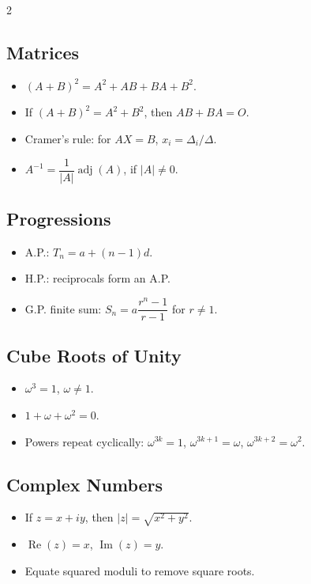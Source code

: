 \documentclass[11pt,a4paper]{article}
\begin{document}
\begin{multicols}{2}
\subsection*{Matrices}
\begin{itemize}[leftmargin=*]
\item $(A+B)^2=A^2+AB+BA+B^2$.
\item If $(A+B)^2=A^2+B^2$, then $AB+BA=O$.
\item Cramer's rule: for $AX=B$, $x_i=\Delta_i/\Delta$.
\item $A^{-1}=\dfrac{1}{|A|}\operatorname{adj}(A)$, if $|A|\ne0$.
\end{itemize}

\subsection*{Progressions}
\begin{itemize}[leftmargin=*]
\item A.P.: $T_n=a+(n-1)d$.
\item H.P.: reciprocals form an A.P.
\item G.P. finite sum: $S_n=a\dfrac{r^n-1}{r-1}$ for $r\ne1$.
\end{itemize}

\subsection*{Cube Roots of Unity}
\begin{itemize}[leftmargin=*]
\item $\omega^3=1$, $\omega\ne1$.
\item $1+\omega+\omega^2=0$.
\item Powers repeat cyclically: $\omega^{3k}=1$, $\omega^{3k+1}=\omega$, $\omega^{3k+2}=\omega^2$.
\end{itemize}

\subsection*{Complex Numbers}
\begin{itemize}[leftmargin=*]
\item If $z=x+iy$, then $|z|=\sqrt{x^2+y^2}$.
\item $\operatorname{Re}(z)=x$, $\operatorname{Im}(z)=y$.
\item Equate squared moduli to remove square roots.
\end{itemize}


\end{multicols}
\end{document}

